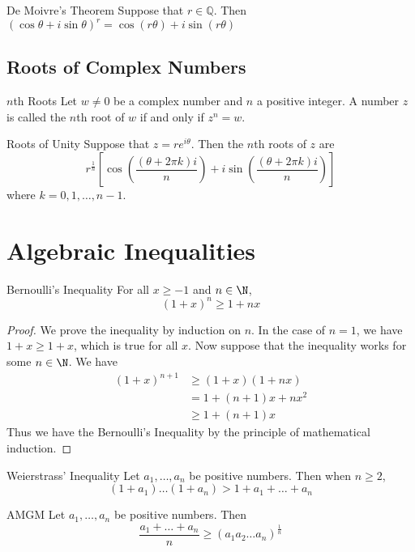 \begin{thm}{De Moivre's Theorem}{} Suppose that $r\in\mathbb{Q}$. Then $(\cos{\theta}+i\sin{\theta})^r=\cos{(r\theta)}+i\sin{(r\theta)}$
\end{thm}

\subsection{Roots of Complex Numbers}
\begin{defn}{$n$th Roots}{} Let $w\neq0$ be a complex number and $n$ a positive integer. A number $z$ is called the $n$th root of $w$ if and only if $z^n=w$. 
\end{defn}

\begin{thm}{Roots of Unity}{} Suppose that $z=re^{i\theta}$. Then the $n$th roots of $z$ are $$r^{\frac{1}{n}}\left[\cos{\left(\frac{(\theta+2\pi k)i}{n}\right)}+i\sin{\left(\frac{(\theta+2\pi k)i}{n}\right)}\right]$$ where $k=0,1,\dots,n-1$. 
\end{thm}

\pagebreak
\section{Algebraic Inequalities}
\begin{thm}{Bernoulli's Inequality}{} For all $x\geq-1$ and $n\in\N$, $$(1+x)^n\geq1+nx$$\tcbline
\begin{proof} We prove the inequality by induction on $n$. In the case of $n=1$, we have $1+x\geq1+x$, which is true for all $x$. Now suppose that the inequality works for some $n\in\N$. We have 
\begin{align*}
(1+x)^{n+1}&\geq(1+x)(1+nx) \tag{Induction Hypothesis and $x\geq-1$} \\
&=1+(n+1)x+nx^2 \\
&\geq1+(n+1)x \tag{since $x^2\geq0$}
\end{align*}
Thus we have the Bernoulli's Inequality by the principle of mathematical induction. 
\end{proof}
\end{thm}

\begin{thm}{Weierstrass' Inequality}{} Let $a_1,\dots,a_n$ be positive numbers. Then when $n\geq2$, $$(1+a_1)\dots(1+a_n)>1+a_1+\dots+a_n$$
\end{thm}

\begin{thm}{AMGM}{} Let $a_1,\dots,a_n$ be positive numbers. Then $$\frac{a_1+\dots+a_n}{n}\geq(a_1a_2\dots a_n)^\frac{1}{n}$$
\end{thm}

